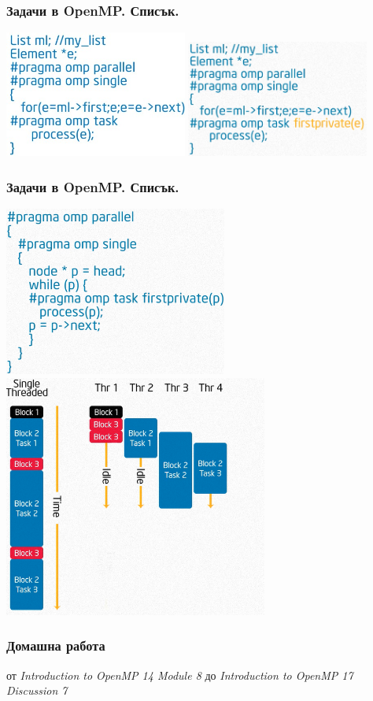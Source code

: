 \documentclass{beamer}
\begin{document}
\begin{frame}[plain]
  \frametitle{Задачи в OpenMP. Списък.}
  \centering
  \includegraphics[width=0.45\textwidth]{task-list0}
  \includegraphics[width=0.45\textwidth]{task-list}
\end{frame}

\begin{frame}[plain]
  \frametitle{Задачи в OpenMP. Списък.}
  \centering
  \includegraphics[width=0.55\textwidth]{task-list1}
  \includegraphics[width=0.65\textwidth]{task-list1-image}
\end{frame}


\begin{frame}
  \frametitle{Домашна работа}
  от \textit{Introduction to OpenMP 14 Module 8} до \textit{Introduction to OpenMP 17 Discussion 7}
\end{frame}
\end{document}
